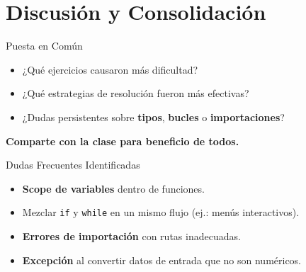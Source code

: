 \documentclass[10pt]{beamer}
\begin{document}
\section{Discusión y Consolidación}

\begin{frame}{Puesta en Común}
  \begin{itemize}
    \item ¿Qué ejercicios causaron más dificultad?
    \item ¿Qué estrategias de resolución fueron más efectivas?
    \item ¿Dudas persistentes sobre \textbf{tipos}, \textbf{bucles} o \textbf{importaciones}?
  \end{itemize}
  \vspace{0.3cm}
  \textbf{Comparte con la clase para beneficio de todos.}
\end{frame}

\begin{frame}{Dudas Frecuentes Identificadas}
  \begin{itemize}
    \item \textbf{Scope de variables} dentro de funciones.
    \item Mezclar \texttt{if} y \texttt{while} en un mismo flujo (ej.: menús interactivos).
    \item \textbf{Errores de importación} con rutas inadecuadas.
    \item \textbf{Excepción} al convertir datos de entrada que no son numéricos.
  \end{itemize}
\end{frame}
\end{document}
